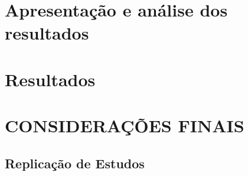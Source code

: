 \documentclass[12pt,12pt,openright,oneside,a4paper,chapter=TITLE,section=TITLE,subsection=TITLE,subsubsection=TITLE english,french,spanish,portugues,sumario=tradicional]{abntex2}
\begin{document}
\chapter{Apresentação e análise dos resultados}

\chapter{Resultados}


\chapter*[Conclusão]{CONSIDERAÇÕES FINAIS}

\postextual


\postextual


{\begin{apendicesenv}

\renewcommand{\thechapter}{\arabic{chapter}}

\chapter{Replicação de Estudos}
\section{}
 
\end{apendicesenv}
}{}



\printbibliography
\end{document}

